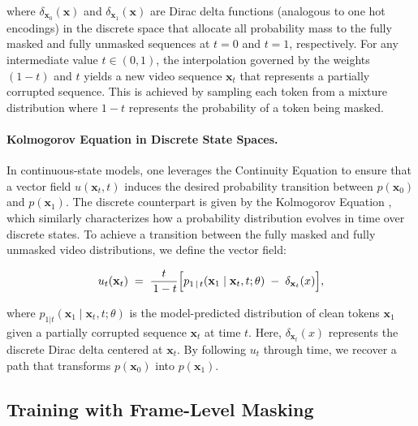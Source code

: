 where \(\delta_{\mathbf{x}_0}(\mathbf{x})\) and \(\delta_{\mathbf{x}_1}(\mathbf{x})\) are Dirac delta functions (analogous to one hot encodings) in the discrete space that allocate all probability mass to the fully masked and fully unmasked sequences at $t=0$ and $t=1$, respectively. For any intermediate value \(t \in (0,1)\), the interpolation governed by the weights \((1-t)\) and \(t\) yields a new video sequence \(\mathbf{x}_t\) that represents a partially corrupted sequence. This is achieved by sampling each token from a mixture distribution where $1-t$ represents the probability of a token being masked.
\vspace{-10pt}
\paragraph{Kolmogorov Equation in Discrete State Spaces.}
In continuous-state models, one leverages the Continuity Equation \cite{song2021scorebased_sde} to ensure that a vector field \(u(\mathbf{x}_t, t)\) induces the desired probability transition between \(p(\mathbf{x}_0)\) and \(p(\mathbf{x}_1)\). The discrete counterpart is given by the Kolmogorov Equation \cite{campbell2024generative}, which similarly characterizes how a probability distribution evolves in time over discrete states. To achieve a transition between the fully masked and fully unmasked video distributions, we define the vector field:

\begin{equation}
    u_t(\mathbf{x}_t) 
    \;=\; 
    \frac{t}{\,1 - t} 
    \Bigl[
    p_{1 \,\vert\, t}(\mathbf{x}_1 \mid \mathbf{x}_t, t; \theta) 
    \;-\; 
    \delta_{\mathbf{x}_t}(x)
    \Bigr],
\end{equation}

where \(p_{1|t}(\mathbf{x}_1 \mid \mathbf{x}_t, t; \theta)\) is the model-predicted distribution of clean tokens \(\mathbf{x}_1\) given a partially corrupted sequence \(\mathbf{x}_t\) at time \(t\). Here, \(\delta_{\mathbf{x}_t}(x)\) represents the discrete Dirac delta centered at \(\mathbf{x}_t\). By following \(u_t\) through time, we recover a path that transforms \(p(\mathbf{x}_0)\) into \(p(\mathbf{x}_1)\).

\subsection{Training with Frame-Level Masking}
\label{subsec:training}

